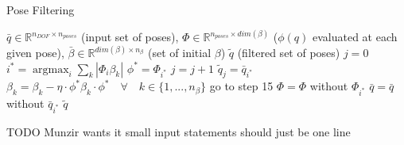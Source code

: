 \documentclass[letterpaper, 10pt, conference]{ieeeconf}
\DeclareMathOperator*{\argmax}{argmax}
\begin{document}
\begin{algorithm}
    \caption{Pose Filtering}
    \begin{algorithmic}[1]
        \renewcommand{\algorithmicrequire}{\textbf{Input:}}
        \renewcommand{\algorithmicensure}{\textbf{Output:}}
        \REQUIRE $\bar{q} \in \mathbb{R}^{n_{DOF} \times n_{poses}}$ (input set
        of poses),
        \newline $\Phi \in \mathbb{R}^{n_{poses} \times dim(\beta)}$ ($\phi(q)$ evaluated at each given pose),
        \newline $\bar{\beta} \in \mathbb{R}^{dim(\beta) \times n_{\beta}}$ (set of initial $\beta$)
        \ENSURE  $\widetilde{q}$ (filtered set of poses)
        \STATE $ j = 0 $
        \STATE $i^* = \argmax_i \sum_k | \Phi_i \beta_k |$
        \STATE $\phi^* = \Phi_{i^{*}}$
        \STATE $j = j + 1$
        \STATE $\widetilde{q}_j = \bar{q}_{i^*} $
        \STATE $\beta_k = \beta_k - \eta \cdot \phi^* \beta_k \cdot \phi^* \quad \forall \quad k \in \{1, ..., n_\beta \}$
        \STATE go to step 15
        \ELSE
        \STATE $\Phi = \Phi $ without $ \Phi_{i^*} $
        \STATE $\bar{q} = \bar{q} $ without $ \bar{q}_{i^*} $
        \ENDIF
        \ENDWHILE
        \RETURN $\widetilde{q}$
    \end{algorithmic}
\end{algorithm}

TODO Munzir wants it small
input statements should just be one line
\end{document}
